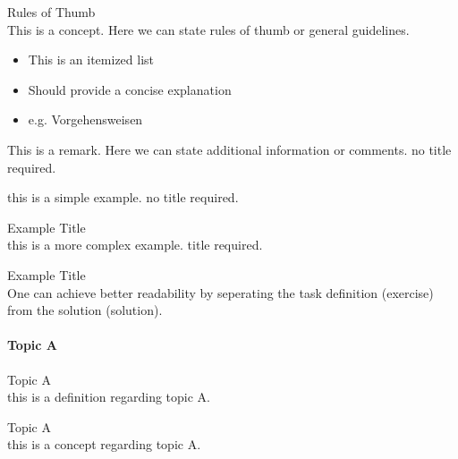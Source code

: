 \begin{concept}{Rules of Thumb}\\
    This is a concept. Here we can state rules of thumb or general guidelines.
    \begin{itemize}
        \item This is an itemized list
        \item Should provide a concise explanation
        \item e.g. Vorgehensweisen
    \end{itemize}
\end{concept}

\begin{remark}
    This is a remark. Here we can state additional information or comments. no title required.
\end{remark}

\begin{example}
    this is a simple example. no title required.
\end{example}

\begin{example2}{Example Title}\\
    this is a more complex example. title required.
\end{example2}

\begin{example2}{Example Title}\\
    One can achieve better readability by seperating the task definition (exercise)
    \tcblower
    from the solution (solution).
\end{example2}

\paragraph{Topic A}


\begin{definition}{Topic A}\\
    this is a definition regarding topic A.
\end{definition}

\begin{concept}{Topic A}\\
    this is a concept regarding topic A.
\end{concept}

